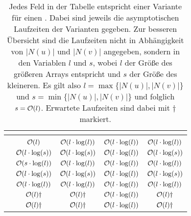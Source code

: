 \begin{table}
	\centering
	\begin{tabular}{c||c|c||c|c}
		 & \multicolumn{2}{c||}{\distr} & \multicolumn{2}{c}{\perm} \\ \hline \hline
		\fett{vorsortiert} & \true & \false & \true & \false
		\\ \hline\hline
		\SorSor 	& $\mathcal{O}(l)$ 				& $\mathcal{O}(l\cdot \log(l))$ 		& $\mathcal{O}(l \cdot \log(l))$ 					& $\mathcal{O}(l\cdot \log(l))$ 	\\ \hline
		\SeaSor 	& $\mathcal{O}(l\cdot \log(s))$ 	& $\mathcal{O}(l\cdot  \log(s))$ 	& $\mathcal{O}(l\cdot  \log(l))$ 	& $\mathcal{O}(l\cdot  \log(s))$ \\ \hline
		\SorSea 	& $\mathcal{O}(s\cdot \log(l))$ 	& $\mathcal{O}(l\cdot  \log(l))$ 	& $\mathcal{O}(l\cdot  \log(l))$ 	& $\mathcal{O}(l\cdot  \log(l))$ \\ \hline
		\SeaSet 	& $\mathcal{O}(l\cdot \log(s))$ 	& $\mathcal{O}(l\cdot  \log(s))$ 	& $\mathcal{O}(l\cdot  \log(l))$ 	& $\mathcal{O}(l\cdot  \log(s))$ \\ \hline
		\SetSea 	& $\mathcal{O}(l\cdot \log(l))$ 	& $\mathcal{O}(l\cdot  \log(l))$ 	& $\mathcal{O}(l\cdot  \log(l))$ 	& $\mathcal{O}(l\cdot  \log(l))$ \\ \hline
		\SeaUSet	& $\mathcal{O}(l) \dagger$		& $\mathcal{O}(l) \dagger$ 			& $\mathcal{O}(l\cdot  \log(l))$ 	& $\mathcal{O}(l) \dagger$		\\ \hline
		\USetSea	& $\mathcal{O}(l) \dagger$ 		& $\mathcal{O}(l) \dagger$ 			& $\mathcal{O}(l\cdot  \log(l))$ 	& $\mathcal{O}(l) \dagger$
	\end{tabular}
	\caption[Aufzählung aller Methoden, welche für einen \ct{} betrachtet werden. Dazu sind jeweils 
	die asymptotischen Laufzeiten gegeben.]
	{Jedes Feld in der Tabelle entspricht einer Variante für einen \ct{}.
	Dabei sind jeweils die asymptotischen Laufzeiten der Varianten gegeben. Zur besseren 
	Übersicht sind die Laufzeiten nicht in Abhängigkeit von $|N(u)|$ und $|N(v)|$ angegeben, 
	sondern in den Variablen $l$ und $s$, wobei $l$ der Größe des größeren Arrays entspricht und
	$s$ der Größe des kleineren. Es gilt also $l = \max\{|N(u)|,|N(v)|\}$ und $s = \min\{|N(u)|,|N(v)|\}$ und folglich $s = \mathcal{O}(l)$.
	Erwartete Laufzeiten sind dabei mit $\dagger$ markiert.}
	\label{tab:varianten}
\end{table}




